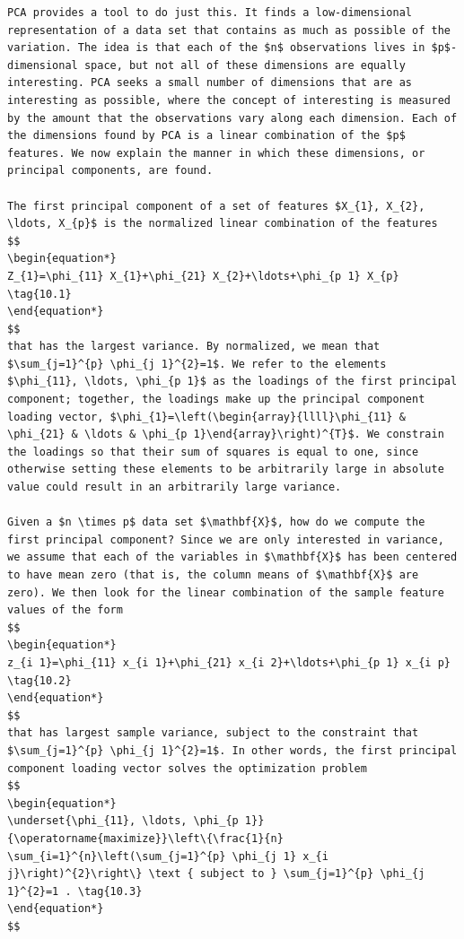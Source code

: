\documentclass[10pt]{article}
\begin{document}
\begin{verbatim}
PCA provides a tool to do just this. It finds a low-dimensional representation of a data set that contains as much as possible of the variation. The idea is that each of the $n$ observations lives in $p$-dimensional space, but not all of these dimensions are equally interesting. PCA seeks a small number of dimensions that are as interesting as possible, where the concept of interesting is measured by the amount that the observations vary along each dimension. Each of the dimensions found by PCA is a linear combination of the $p$ features. We now explain the manner in which these dimensions, or principal components, are found.

The first principal component of a set of features $X_{1}, X_{2}, \ldots, X_{p}$ is the normalized linear combination of the features
$$
\begin{equation*}
Z_{1}=\phi_{11} X_{1}+\phi_{21} X_{2}+\ldots+\phi_{p 1} X_{p} \tag{10.1}
\end{equation*}
$$
that has the largest variance. By normalized, we mean that $\sum_{j=1}^{p} \phi_{j 1}^{2}=1$. We refer to the elements $\phi_{11}, \ldots, \phi_{p 1}$ as the loadings of the first principal
component; together, the loadings make up the principal component loading vector, $\phi_{1}=\left(\begin{array}{llll}\phi_{11} & \phi_{21} & \ldots & \phi_{p 1}\end{array}\right)^{T}$. We constrain the loadings so that their sum of squares is equal to one, since otherwise setting these elements to be arbitrarily large in absolute value could result in an arbitrarily large variance.

Given a $n \times p$ data set $\mathbf{X}$, how do we compute the first principal component? Since we are only interested in variance, we assume that each of the variables in $\mathbf{X}$ has been centered to have mean zero (that is, the column means of $\mathbf{X}$ are zero). We then look for the linear combination of the sample feature values of the form
$$
\begin{equation*}
z_{i 1}=\phi_{11} x_{i 1}+\phi_{21} x_{i 2}+\ldots+\phi_{p 1} x_{i p} \tag{10.2}
\end{equation*}
$$
that has largest sample variance, subject to the constraint that $\sum_{j=1}^{p} \phi_{j 1}^{2}=1$. In other words, the first principal component loading vector solves the optimization problem
$$
\begin{equation*}
\underset{\phi_{11}, \ldots, \phi_{p 1}}{\operatorname{maximize}}\left\{\frac{1}{n} \sum_{i=1}^{n}\left(\sum_{j=1}^{p} \phi_{j 1} x_{i j}\right)^{2}\right\} \text { subject to } \sum_{j=1}^{p} \phi_{j 1}^{2}=1 . \tag{10.3}
\end{equation*}
$$


\end{verbatim}
\end{document}
